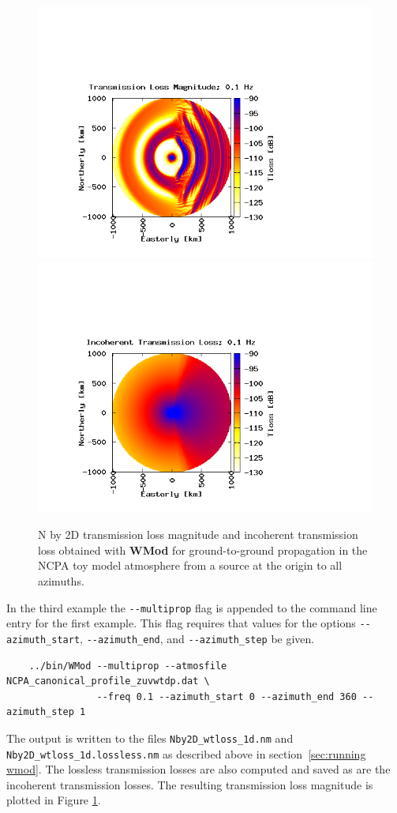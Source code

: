 \begin{figure}[h]
\begin{center}
\includegraphics[scale=0.45,trim = 70 20 180 140,clip]{figs/wmod_ex3}
\includegraphics[scale=0.45,trim = 70 20 180 140,clip]{figs/wmod_ex3_inco}
\end{center}
\caption{N by 2D transmission loss magnitude and incoherent transmission loss obtained with {\bf WMod} for ground-to-ground propagation in the NCPA toy model atmosphere from a source at the origin to all azimuths.}
\label{fig: wmod Nby2D tl}
\end{figure}

In the third example the \verb+--multiprop+ flag is appended to the command line entry for the first example. This flag requires that values for the options \verb+--azimuth_start+, \verb+--azimuth_end+, and \verb+--azimuth_step+ be given. 
\begin{verbatim} 
    ../bin/WMod --multiprop --atmosfile NCPA_canonical_profile_zuvwtdp.dat \
                --freq 0.1 --azimuth_start 0 --azimuth_end 360 --azimuth_step 1
\end{verbatim}
The output is written to the files \verb+Nby2D_wtloss_1d.nm+ and \verb+Nby2D_wtloss_1d.lossless.nm+ as described above in section~\ref{sec:running wmod}. The lossless transmission losses are also computed and saved as are the incoherent transmission losses. The resulting transmission loss magnitude is plotted in Figure \ref{fig: wmod Nby2D tl}. 